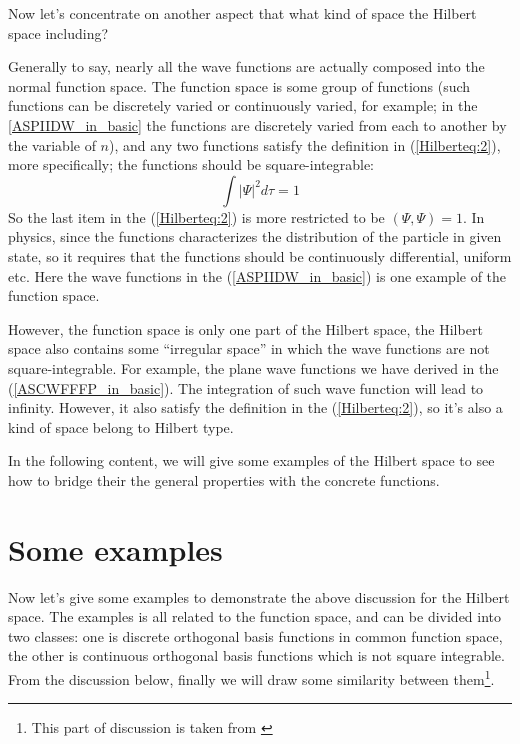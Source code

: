 Now let's concentrate on another aspect that what kind of space the
Hilbert space including?

Generally to say, nearly all the wave functions are actually composed
into the normal function space. The function space is some group of
functions (such functions can be discretely varied or continuously
varied, for example; in the \ref{ASPIIDW_in_basic} the functions are
discretely varied from each to another by the variable of $n$), and any
two functions satisfy the definition in (\ref{Hilberteq:2}), more
specifically; the functions should be square-integrable:
\begin{equation}
  \int |\Psi|^{2} d\tau = 1
\end{equation}
So the last item in the (\ref{Hilberteq:2}) is more restricted to be
$(\Psi, \Psi) = 1$. In physics, since the functions characterizes
the distribution of the particle in given state, so it requires that
the functions should be continuously differential, uniform etc. Here
the wave functions in the (\ref{ASPIIDW_in_basic}) is one example of
the function space.

However, the function space is only one part of the Hilbert space, the
Hilbert space also contains some ``irregular space'' in which the wave
functions are not square-integrable. For example, the plane wave
functions we have derived in the (\ref{ASCWFFFP_in_basic}). The
integration of such wave function will lead to infinity. However, it
also satisfy the definition in the (\ref{Hilberteq:2}), so it's also a
kind of space belong to Hilbert type.

In the following content, we will give some examples of the Hilbert
space to see how to bridge their the general properties with the
concrete functions.


\section{Some examples}
\label{sec:SE_in_Hilbert_space}

Now let's give some examples to demonstrate the above discussion for
the Hilbert space. The examples is all related to the function space,
and can be divided into two classes: one is discrete orthogonal basis
functions in common function space, the other is continuous orthogonal
basis functions which is not square integrable. From the discussion
below, finally we will draw some similarity between them\footnote{This
  part of discussion is taken from \cite{Coden}}.


